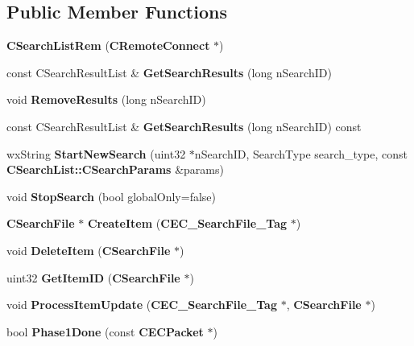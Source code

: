 \subsection*{Public Member Functions}
\begin{DoxyCompactItemize}
\item 
{\bfseries CSearchListRem} ({\bf CRemoteConnect} $\ast$)\label{classCSearchListRem_a47b12b4fd3c713c3ec3141c26679cf3d}

\item 
const CSearchResultList \& {\bfseries GetSearchResults} (long nSearchID)\label{classCSearchListRem_a56596aa32e715a34deb0a212298e5c8f}

\item 
void {\bfseries RemoveResults} (long nSearchID)\label{classCSearchListRem_a6eecf5c5771c3476b610018812b40caf}

\item 
const CSearchResultList \& {\bfseries GetSearchResults} (long nSearchID) const \label{classCSearchListRem_aee755e35e394b73dc5838ba55615eda5}

\item 
wxString {\bfseries StartNewSearch} (uint32 $\ast$nSearchID, SearchType search\_\-type, const {\bf CSearchList::CSearchParams} \&params)\label{classCSearchListRem_ab96de8e3df92137ce2715f7a9efe78ed}

\item 
void {\bfseries StopSearch} (bool globalOnly=false)\label{classCSearchListRem_a542b7cf810a056008263a5ca988d02d7}

\item 
{\bf CSearchFile} $\ast$ {\bfseries CreateItem} ({\bf CEC\_\-SearchFile\_\-Tag} $\ast$)\label{classCSearchListRem_ae1fdcf89e9a9cb170798c172e6eae87e}

\item 
void {\bfseries DeleteItem} ({\bf CSearchFile} $\ast$)\label{classCSearchListRem_a3539e928e3cde6a519d4b491d535d570}

\item 
uint32 {\bfseries GetItemID} ({\bf CSearchFile} $\ast$)\label{classCSearchListRem_a72b64d1f2309e9bb2eadbadd5bac4549}

\item 
void {\bfseries ProcessItemUpdate} ({\bf CEC\_\-SearchFile\_\-Tag} $\ast$, {\bf CSearchFile} $\ast$)\label{classCSearchListRem_a073c7b5765ffa532b7894b97ae5de414}

\item 
bool {\bfseries Phase1Done} (const {\bf CECPacket} $\ast$)\label{classCSearchListRem_a720c07681b147828d12250328bbd8e93}

\end{DoxyCompactItemize}

